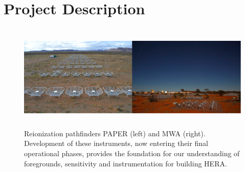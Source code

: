 \documentclass[preprint]{aastex}
\begin{document}





\vspace{-0.25in}
\section{Project Description}
\label{PDsec}
\begin{figure}[!ht]\centering
\includegraphics[height=2in]{plots/PAPER_and_MWA.jpg}
\caption{\small
Reionization pathfinders PAPER (left) and MWA (right). Development of these instruments, now entering their final operational phases, provides the foundation for our understanding of foregrounds, sensitivity and instrumentation for building HERA.
}
\end{figure}
\end{document}
